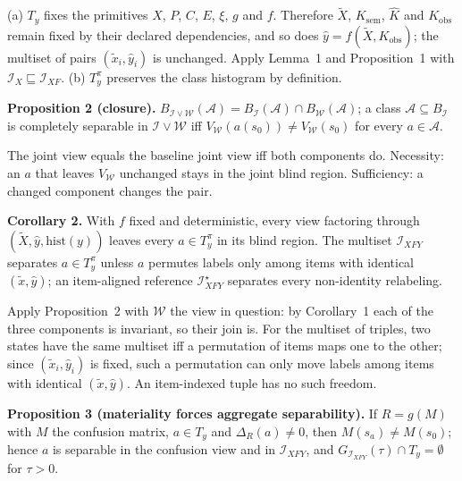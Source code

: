 \documentclass[10pt,journal,compsoc]{IEEEtran}
\newcommand{\IX}{\mathcal I_X}
\newcommand{\IXF}{\mathcal I_{XF}}
\newcommand{\IXFY}{\mathcal I_{XFY}}
\newcommand{\IXFYs}{\mathcal I_{XFY}^{\star}}
\begin{document}
\begin{IEEEproof}
(a) $T_y$ fixes the primitives $X$, $P$, $C$, $E$, $\xi$, $g$ and $f$.
Therefore $\tilde X$, $K_{\mathrm{sem}}$, $\hat K$ and $K_{\mathrm{obs}}$
remain fixed by their declared dependencies, and so does
$\hat y=f(\tilde X,K_{\mathrm{obs}})$;
the multiset of pairs $(\tilde x_i,\hat y_i)$ is unchanged. Apply Lemma~1 and
Proposition~1 with $\IX\sqsubseteq\IXF$. (b) $T_y^{\pi}$ preserves the class
histogram by definition.
\end{IEEEproof}

\textbf{Proposition 2 (closure).}
$B_{\mathcal I\vee\mathcal W}(\mathcal A)=B_{\mathcal I}(\mathcal A)\cap B_{\mathcal W}(\mathcal A)$;
a class $\mathcal A\subseteq B_{\mathcal I}$ is completely separable in
$\mathcal I\vee\mathcal W$ iff $V_{\mathcal W}(a(s_0))\ne V_{\mathcal W}(s_0)$
for every $a\in\mathcal A$.

\begin{IEEEproof}
The joint view equals the baseline joint view iff both components do.
Necessity: an $a$ that leaves $V_{\mathcal W}$ unchanged stays in the joint
blind region. Sufficiency: a changed component changes the pair.
\end{IEEEproof}

\textbf{Corollary 2.} With $f$ fixed and deterministic, every view factoring
through $(\tilde X,\hat y,\mathrm{hist}(y))$ leaves every $a\in T_y^{\pi}$
in its blind region. The multiset $\IXFY$ separates $a\in T_y^{\pi}$ unless
$a$ permutes labels only among items with identical $(\tilde x,\hat y)$; an
item-aligned reference $\IXFYs$ separates every non-identity relabeling.

\begin{IEEEproof}
Apply Proposition~2 with $\mathcal W$ the view in question: by Corollary~1
each of the three components is invariant, so their join is. For the
multiset of triples, two states have the same multiset iff a permutation of
items maps one to the other; since $(\tilde x_i,\hat y_i)$ is fixed, such a
permutation can only move labels among items with identical
$(\tilde x,\hat y)$. An item-indexed tuple has no such freedom.
\end{IEEEproof}

\textbf{Proposition 3 (materiality forces aggregate separability).} If
$R=g(M)$ with $M$ the confusion matrix, $a\in T_y$ and $\Delta_R(a)\ne0$, then
$M(s_a)\ne M(s_0)$; hence $a$ is separable in the confusion view and in
$\IXFY$, and $G_{\IXFY}(\tau)\cap T_y=\emptyset$ for $\tau>0$.
\end{document}
